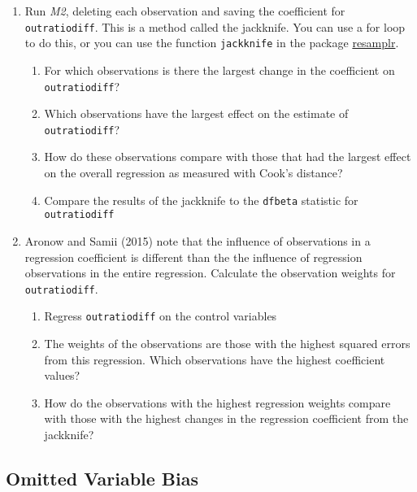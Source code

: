\documentclass[]{article}
\providecommand{\tightlist}{%
  \setlength{\itemsep}{0pt}\setlength{\parskip}{0pt}}
\begin{document}
\begin{enumerate}
\def\labelenumi{\arabic{enumi}.}
\item
  Run \emph{M2}, deleting each observation and saving the coefficient
  for \texttt{outratiodiff}. This is a method called the jackknife. You
  can use a for loop to do this, or you can use the function
  \texttt{jackknife} in the package
  \href{https://github.com/jrnold/resamplr}{resamplr}.

  \begin{enumerate}
  \def\labelenumii{\arabic{enumii}.}
  \tightlist
  \item
    For which observations is there the largest change in the
    coefficient on \texttt{outratiodiff}?
  \item
    Which observations have the largest effect on the estimate of
    \texttt{outratiodiff}?
  \item
    How do these observations compare with those that had the largest
    effect on the overall regression as measured with Cook's distance?
  \item
    Compare the results of the jackknife to the \texttt{dfbeta}
    statistic for \texttt{outratiodiff}
  \end{enumerate}
\item
  Aronow and Samii (2015) note that the influence of observations in a
  regression coefficient is different than the the influence of
  regression observations in the entire regression. Calculate the
  observation weights for \texttt{outratiodiff}.

  \begin{enumerate}
  \def\labelenumii{\arabic{enumii}.}
  \tightlist
  \item
    Regress \texttt{outratiodiff} on the control variables
  \item
    The weights of the observations are those with the highest squared
    errors from this regression. Which observations have the highest
    coefficient values?
  \item
    How do the observations with the highest regression weights compare
    with those with the highest changes in the regression coefficient
    from the jackknife?
  \end{enumerate}
\end{enumerate}

\subsection{Omitted Variable Bias}\label{omitted-variable-bias}
\end{document}

